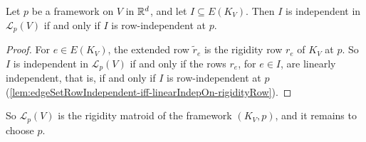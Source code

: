 \begin{lemma}
  \label{lem:linearRigidityMatroid-indep-iff}
  \leanok
  Let $p$ be a framework on $V$ in ${\mathbb{R}}^{d}$, and let
  $I \subseteq E(K_V)$. Then $I$ is independent in $\mathcal{L}_p(V)$
  if and only if $I$ is row-independent at $p$.
\end{lemma}
\begin{proof}
  \leanok
  For $e \in E(K_V)$, the extended row $\tilde r_e$ is the rigidity row
  $r_e$ of $K_V$ at $p$. So $I$ is independent in $\mathcal{L}_p(V)$ if
  and only if the rows $r_e$, for $e \in I$, are linearly independent,
  that is, if and only if $I$ is row-independent at $p$
  (\cref{lem:edgeSetRowIndependent-iff-linearIndepOn-rigidityRow}).
\end{proof}

So $\mathcal{L}_p(V)$ is the rigidity matroid of the framework
$(K_V, p)$, and it remains to choose $p$.

